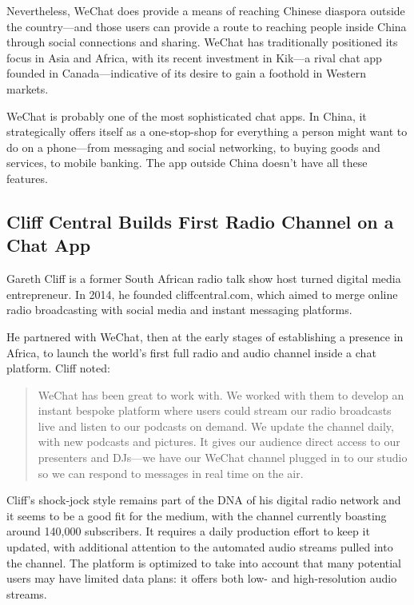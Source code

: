 \documentclass[notoc, symmetric, nobib, nols]{towcenter-guideto-book}
\begin{document}
Nevertheless, WeChat does provide a means of reaching Chinese diaspora outside the country---and those users can provide a route to reaching people inside China through social connections and sharing. WeChat has traditionally positioned its focus in Asia and Africa, with its recent investment in Kik---a rival chat app founded in Canada---indicative of its desire to gain a foothold in Western markets.

WeChat is probably one of the most sophisticated chat apps. In China, it strategically offers itself as a one-stop-shop for everything a person might want to do on a phone---from messaging and social networking, to buying goods and services, to mobile banking. The app outside China doesn't have all these features.

\subsection{Cliff Central Builds First Radio Channel on a Chat App}

Gareth Cliff is a former South African radio talk show host turned digital media entrepreneur. In 2014, he founded cliffcentral.com, which aimed to merge online radio broadcasting with social media and instant messaging platforms.\autocite{CNNCliff}

He partnered with WeChat, then at the early stages of establishing a presence in Africa, to launch the world's first full radio and audio channel inside a chat platform. Cliff noted:

\begin{quote}
WeChat has been great to work with. We worked with them to develop an instant bespoke platform where users could stream our radio broadcasts live and listen to our podcasts on demand. We update the channel daily, with new podcasts and pictures. It gives our audience direct access to our presenters and DJs---we have our WeChat channel plugged in to our studio so we can respond to messages in real time on the air.
\end{quote}

Cliff's shock-jock style remains part of the DNA of his digital radio network and it seems to be a good fit for the medium, with the channel currently boasting around 140,000 subscribers. It requires a daily production effort to keep it updated, with additional attention to the automated audio streams pulled into the channel. The platform is optimized to take into account that many potential users may have limited data plans: it offers both low- and high-resolution audio streams.
\end{document}
